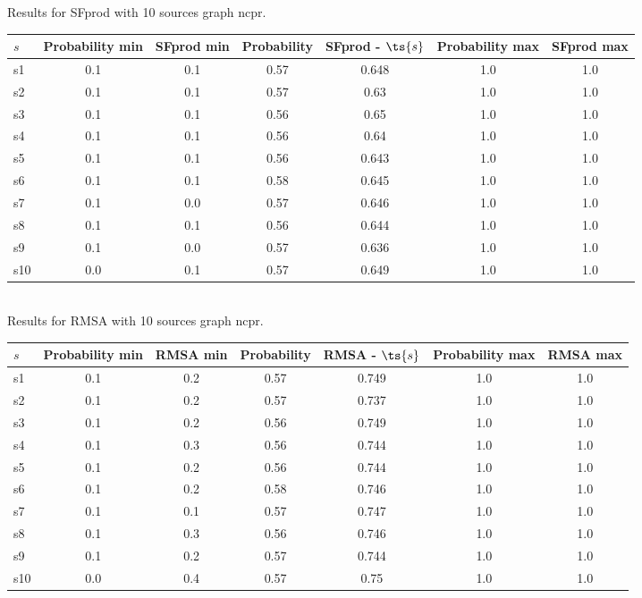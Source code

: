 \documentclass{article}
\begin{document}
\noindent Results for SFprod with 10 sources graph ncpr.

\noindent\begin{tabular}{|l|c|c|c|c|c|c|}
\hline
$s$& Probability min & SFprod min & Probability & SFprod - $\ts{s}$ & Probability max & SFprod max\\
\hline
s1 &0.1 & 0.1 & 0.57 & 0.648 & 1.0 & 1.0\\
\hline
s2 &0.1 & 0.1 & 0.57 & 0.63 & 1.0 & 1.0\\
\hline
s3 &0.1 & 0.1 & 0.56 & 0.65 & 1.0 & 1.0\\
\hline
s4 &0.1 & 0.1 & 0.56 & 0.64 & 1.0 & 1.0\\
\hline
s5 &0.1 & 0.1 & 0.56 & 0.643 & 1.0 & 1.0\\
\hline
s6 &0.1 & 0.1 & 0.58 & 0.645 & 1.0 & 1.0\\
\hline
s7 &0.1 & 0.0 & 0.57 & 0.646 & 1.0 & 1.0\\
\hline
s8 &0.1 & 0.1 & 0.56 & 0.644 & 1.0 & 1.0\\
\hline
s9 &0.1 & 0.0 & 0.57 & 0.636 & 1.0 & 1.0\\
\hline
s10 &0.0 & 0.1 & 0.57 & 0.649 & 1.0 & 1.0\\
\hline
\end{tabular}\\

\noindent Results for RMSA with 10 sources graph ncpr.

\noindent\begin{tabular}{|l|c|c|c|c|c|c|}
\hline
$s$& Probability min & RMSA min & Probability & RMSA - $\ts{s}$ & Probability max & RMSA max\\
\hline
s1 &0.1 & 0.2 & 0.57 & 0.749 & 1.0 & 1.0\\
\hline
s2 &0.1 & 0.2 & 0.57 & 0.737 & 1.0 & 1.0\\
\hline
s3 &0.1 & 0.2 & 0.56 & 0.749 & 1.0 & 1.0\\
\hline
s4 &0.1 & 0.3 & 0.56 & 0.744 & 1.0 & 1.0\\
\hline
s5 &0.1 & 0.2 & 0.56 & 0.744 & 1.0 & 1.0\\
\hline
s6 &0.1 & 0.2 & 0.58 & 0.746 & 1.0 & 1.0\\
\hline
s7 &0.1 & 0.1 & 0.57 & 0.747 & 1.0 & 1.0\\
\hline
s8 &0.1 & 0.3 & 0.56 & 0.746 & 1.0 & 1.0\\
\hline
s9 &0.1 & 0.2 & 0.57 & 0.744 & 1.0 & 1.0\\
\hline
s10 &0.0 & 0.4 & 0.57 & 0.75 & 1.0 & 1.0\\
\hline
\end{tabular}\\
\end{document}
